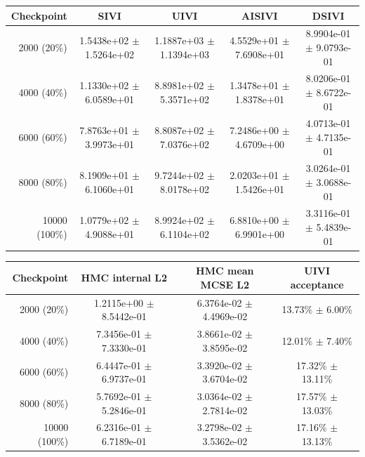 \begin{tabular}{rcccc}
\toprule
Checkpoint & SIVI & UIVI & AISIVI & DSIVI \\
\midrule
2000 (20\%) & 1.5438e+02 $\pm$ 1.5264e+02 & 1.1887e+03 $\pm$ 1.1394e+03 & 4.5529e+01 $\pm$ 7.6908e+01 & 8.9904e-01 $\pm$ 9.0793e-01 \\
4000 (40\%) & 1.1330e+02 $\pm$ 6.0589e+01 & 8.8981e+02 $\pm$ 5.3571e+02 & 1.3478e+01 $\pm$ 1.8378e+01 & 8.0206e-01 $\pm$ 8.6722e-01 \\
6000 (60\%) & 7.8763e+01 $\pm$ 3.9973e+01 & 8.8087e+02 $\pm$ 7.0376e+02 & 7.2486e+00 $\pm$ 4.6709e+00 & 4.0713e-01 $\pm$ 4.7135e-01 \\
8000 (80\%) & 8.1909e+01 $\pm$ 6.1060e+01 & 9.7244e+02 $\pm$ 8.0178e+02 & 2.0203e+01 $\pm$ 1.5426e+01 & 3.0264e-01 $\pm$ 3.0688e-01 \\
10000 (100\%) & 1.0779e+02 $\pm$ 4.9088e+01 & 8.9924e+02 $\pm$ 6.1104e+02 & 6.8810e+00 $\pm$ 6.9901e+00 & 3.3116e-01 $\pm$ 5.4839e-01 \\
\bottomrule
\end{tabular}

\begin{tabular}{rccc}
\toprule
Checkpoint & HMC internal L2 & HMC mean MCSE L2 & UIVI acceptance \\
\midrule
2000 (20\%) & 1.2115e+00 $\pm$ 8.5442e-01 & 6.3764e-02 $\pm$ 4.4969e-02 & 13.73\% $\pm$ 6.00\% \\
4000 (40\%) & 7.3456e-01 $\pm$ 7.3330e-01 & 3.8661e-02 $\pm$ 3.8595e-02 & 12.01\% $\pm$ 7.40\% \\
6000 (60\%) & 6.4447e-01 $\pm$ 6.9737e-01 & 3.3920e-02 $\pm$ 3.6704e-02 & 17.32\% $\pm$ 13.11\% \\
8000 (80\%) & 5.7692e-01 $\pm$ 5.2846e-01 & 3.0364e-02 $\pm$ 2.7814e-02 & 17.57\% $\pm$ 13.03\% \\
10000 (100\%) & 6.2316e-01 $\pm$ 6.7189e-01 & 3.2798e-02 $\pm$ 3.5362e-02 & 17.16\% $\pm$ 13.13\% \\
\bottomrule
\end{tabular}
